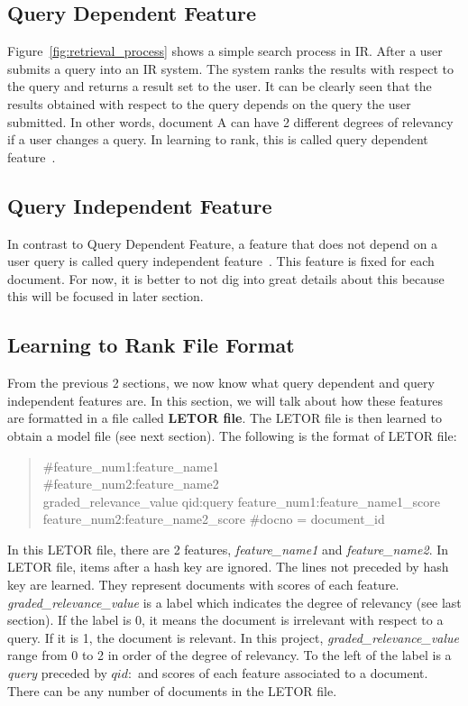 \subsection{Query Dependent Feature}\label{section:querydependent}
Figure~\ref{fig:retrieval_process} shows a simple search process in IR. After a user submits a query into an IR system. The system ranks the results 
with respect to the query and returns a result set to the user. It can be clearly seen that the results obtained with respect to the query depends on the 
query the user submitted. In other words, document A can have 2 different degrees of relevancy if a user changes a query.
In learning to rank, this is called query dependent feature~\cite{craig}.

\subsection{Query Independent Feature}\label{section:queryindependent}
In contrast to Query Dependent Feature, a feature that does not depend on a user query is called query independent feature~\cite{craig}. This feature is fixed for each
document. For now, it is better to not dig into great details about this because this will be focused in later section.

\subsection{Learning to Rank File Format}\label{sec:letorFile}
From the previous 2 sections, we now know what query dependent and query independent features are. In this section, we will talk about how these features
are formatted in a file called \textbf{LETOR file}. The LETOR file is then learned to obtain a model file (see next section).
The following is the format of LETOR file:

\begin{quotation}
\noindent\#feature\_num1:feature\_name1 \\
\#feature\_num2:feature\_name2 \\
graded\_relevance\_value qid:query feature\_num1:feature\_name1\_score feature\_num2:feature\_name2\_score \#docno = document\_id
\end{quotation}

In this LETOR file, there are 2 features, \textit{feature\_name1} and \textit{feature\_name2}. In LETOR file, items after a hash key are ignored.
The lines not preceded by hash key are learned. They represent documents with scores
of each feature. \textit{graded\_relevance\_value} is a label which indicates the degree of relevancy (see last section).
If the label is 0, it means the document is irrelevant with respect to a query. If it is 1, the document is relevant. 
In this project, \textit{graded\_relevance\_value} range from 0 to 2 in order of 
the degree of relevancy. To the left of the label is a \textit{query} preceded by \textit{$qid:$} and scores of each feature associated to a document.
There can be any number of documents in the LETOR file.


